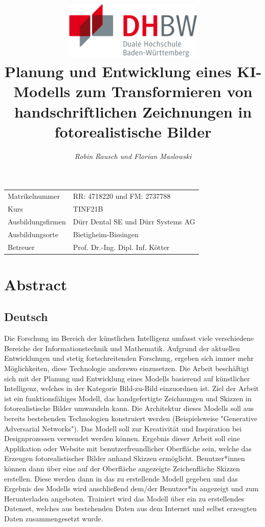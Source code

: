 \documentclass[12pt,a4paper]{article}
\author{\slshape Robin Rausch und Florian Maslowski}
\title{\includegraphics[height=2.75cm]{Bilder/dhbw_logo.png}\vspace{2cm}\\\textbf{Planung und Entwicklung eines KI-Modells zum Transformieren von handschriftlichen Zeichnungen in fotorealistische Bilder}}
\begin{document}
\pagestyle{titlepage}
\clearpage\maketitle
\thispagestyle{empty}
\vspace*{\fill}
\begin{center}
	\begin{tabularx}{\textwidth}{X X}
		Matrikelnummer & RR: 4718220 und FM: 2737788 \\
		Kurs & TINF21B \\
		Ausbildungsfirmen & Dürr Dental SE und Dürr Systems AG \\
		Ausbildungsorte & Bietigheim-Bissingen \\
		Betreuer & Prof. Dr.-Ing. Dipl. Inf. Kötter \\
	\end{tabularx}
\end{center}

\newpage
{}

\pagestyle{fancy_transition}
\section*{Abstract}
\subsection*{Deutsch}
	Die Forschung im Bereich der künstlichen Intelligenz umfasst viele verschiedene Bereiche der Informationstechnik und Mathematik. 
	Aufgrund der aktuellen Entwicklungen und stetig fortschreitenden Forschung, ergeben sich immer mehr Möglichkeiten, diese Technologie anderswo einzusetzen.
	Die Arbeit beschäftigt sich mit der Planung und Entwicklung eines Modells basierend auf künstlicher Intelligenz, welches in der Kategorie Bild-zu-Bild einzuordnen ist. 
	Ziel der Arbeit ist ein funktionsfähiges Modell, das handgefertigte Zeichnungen und Skizzen in fotorealistische Bilder umwandeln kann. 
	Die Architektur dieses Modells soll aus bereits bestehenden Technologien konstruiert werden (Beispielsweise "Generative Adversarial Networks"). 
	Das Modell soll zur Kreativität und Inspiration bei Designprozessen verwendet werden können. 
	Ergebnis dieser Arbeit soll eine Applikation oder Website mit benutzerfreundlicher Oberfläche sein, welche das Erzeugen fotorealistischer Bilder anhand Skizzen ermöglicht. 
	Benutzer*innen können dann über eine auf der Oberfläche angezeigte Zeichenfläche Skizzen erstellen. 
	Diese werden dann in das zu erstellende Modell gegeben und das Ergebnis des Modells wird anschließend dem/der Benutzer*in angezeigt und zum Herunterladen angeboten. 
	Trainiert wird das Modell über ein zu erstellendes Datenset, welches aus bestehenden Daten aus dem Internet und selbst erzeugten Daten zusammengesetzt wurde. 
\end{document}
